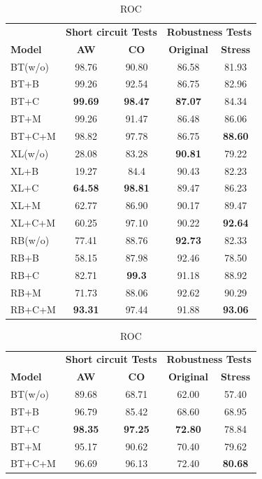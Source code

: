 \begin{table}[th!]
    \scriptsize
    \centering
    \begin{subtable}[t]{0.45\textwidth}
    \centering
    \begin{tabular}{l|cc|cc}\toprule
        & \multicolumn{2}{c|}{\bf Short circuit Tests} & \multicolumn{2}{c}{\bf Robustness Tests} \\ \cline{2-5}
    \textbf{Model} &\textbf{AW} &\textbf{CO} & \textbf{Original} &\textbf{Stress}\\ \hline
    \rowcolor{Gray}
    BT(w/o)&98.76&90.80&86.58&81.93\\
    BT+B&99.26&92.54&86.75&82.96\\
    BT+C&\textbf{99.69}&\textbf{98.47}&\textbf{87.07}&84.34\\
    BT+M&99.26&91.47&86.48&86.06\\
    BT+C+M&98.82&97.78&86.75&\textbf{88.60}\\
    \midrule
    
    \rowcolor{Gray}
    XL(w/o)&28.08&83.28&\textbf{90.81}&79.22\\
    XL+B&19.27&84.4&90.43&82.23\\
    XL+C&\textbf{64.58}&\textbf{98.81}&89.47&86.23\\
    XL+M&62.77&86.90&90.17&89.47\\
    XL+C+M&60.25&97.10&90.22&\textbf{92.64}\\
     \midrule
    \rowcolor{Gray}
    RB(w/o)&77.41&88.76&\textbf{92.73}&82.33\\
    RB+B&58.15&87.98&92.46&78.50\\
    RB+C&82.71&\textbf{99.3}&91.18&88.92\\
    RB+M&71.73&88.06&92.62&90.29\\
    RB+C+M&\textbf{93.31}&97.44&91.88&\textbf{93.06}\\
    \bottomrule
    \end{tabular}
    \caption{ROC}
    \end{subtable} 
    \hfill
    \begin{subtable}[t]{0.45\textwidth}
    \centering
    \begin{tabular}{l|cc|cc}\toprule
        & \multicolumn{2}{c|}{\bf Short circuit Tests} & \multicolumn{2}{c}{\bf Robustness Tests} \\ \cline{2-5}
    \textbf{Model} &\textbf{AW} &\textbf{CO} & \textbf{Original} &\textbf{Stress}\\ \hline
    \rowcolor{Gray}
    BT(w/o)&89.68&68.71&62.00&57.40\\
    BT+B&96.79&85.42&68.60&68.95\\
    BT+C&\textbf{98.35}&\textbf{97.25}&\textbf{72.80}&78.84\\
    BT+M&95.17&90.62&70.40&79.62\\
    BT+C+M&96.69&96.13&72.40&\textbf{80.68}\\
    \midrule
                         

\end{tabular}
\end{subtable}
\end{table}

